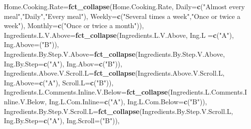 \documentclass[
]{article}
\newenvironment{Shaded}{\begin{snugshade}}{\end{snugshade}}
\newcommand{\DataTypeTok}[1]{\textcolor[rgb]{0.13,0.29,0.53}{#1}}
\newcommand{\KeywordTok}[1]{\textcolor[rgb]{0.13,0.29,0.53}{\textbf{#1}}}
\newcommand{\NormalTok}[1]{#1}
\newcommand{\StringTok}[1]{\textcolor[rgb]{0.31,0.60,0.02}{#1}}
\begin{document}
\begin{Shaded}
\begin{Highlighting}[]
                  \DataTypeTok{Home.Cooking.Rate=}\KeywordTok{fct_collapse}\NormalTok{(Home.Cooking.Rate,}
                                                 \DataTypeTok{Daily=}\KeywordTok{c}\NormalTok{(}\StringTok{"Almost every meal"}\NormalTok{,}\StringTok{"Daily"}\NormalTok{,}\StringTok{"Every meal"}\NormalTok{),}
                                                 \DataTypeTok{Weekly=}\KeywordTok{c}\NormalTok{(}\StringTok{"Several times a week"}\NormalTok{,}\StringTok{"Once or twice a week"}\NormalTok{),}
                                                 \DataTypeTok{Monthly=}\KeywordTok{c}\NormalTok{(}\StringTok{"Once or twice a month"}\NormalTok{)),}
                  \DataTypeTok{Ingredients.L.V.Above=}\KeywordTok{fct_collapse}\NormalTok{(Ingredients.L.V.Above,}
                                                     \DataTypeTok{Ing.L =}\KeywordTok{c}\NormalTok{(}\StringTok{"A"}\NormalTok{),}
                                                     \DataTypeTok{Ing.Above=}\NormalTok{(}\StringTok{"B"}\NormalTok{)),}
                  \DataTypeTok{Ingredients.By.Step.V.Above=}\KeywordTok{fct_collapse}\NormalTok{(Ingredients.By.Step.V.Above,}
                                                           \DataTypeTok{Ing.By.Step=}\KeywordTok{c}\NormalTok{(}\StringTok{"A"}\NormalTok{),}
                                                           \DataTypeTok{Ing.Abov=}\KeywordTok{c}\NormalTok{(}\StringTok{"B"}\NormalTok{)),}
                  \DataTypeTok{Ingredients.Above.V.Scroll.L=}\KeywordTok{fct_collapse}\NormalTok{(Ingredients.Above.V.Scroll.L,}
                                                            \DataTypeTok{Ing.Above=}\KeywordTok{c}\NormalTok{(}\StringTok{"A"}\NormalTok{),}
                                                            \DataTypeTok{Scroll.L=}\KeywordTok{c}\NormalTok{(}\StringTok{"B"}\NormalTok{)),}
                  \DataTypeTok{Ingredients.L.Comments.Inline.V.Below=}\KeywordTok{fct_collapse}\NormalTok{(Ingredients.L.Comments.Inline.V.Below,}
                                                                     \DataTypeTok{Ing.L.Com.Inline=}\KeywordTok{c}\NormalTok{(}\StringTok{"A"}\NormalTok{),}
                                                                     \DataTypeTok{Ing.L.Com.Below=}\KeywordTok{c}\NormalTok{(}\StringTok{"B"}\NormalTok{)),}
                  \DataTypeTok{Ingredients.By.Step.V.Scroll.L=}\KeywordTok{fct_collapse}\NormalTok{(Ingredients.By.Step.V.Scroll.L,}
                                                              \DataTypeTok{Ing.By.Step=}\KeywordTok{c}\NormalTok{(}\StringTok{"A"}\NormalTok{),}
                                                              \DataTypeTok{Ing.Scroll=}\NormalTok{(}\StringTok{"B"}\NormalTok{)),}

\end{Highlighting}
\end{Shaded}
\end{document}
